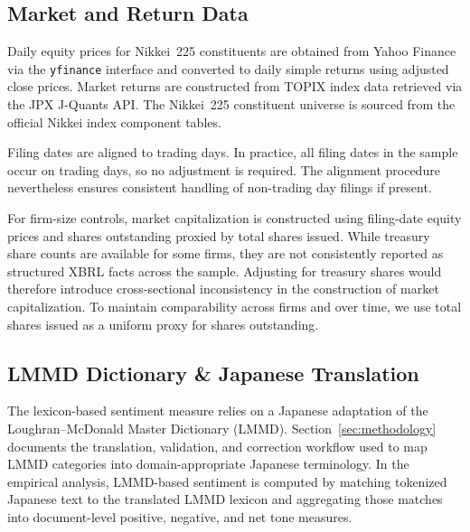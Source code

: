 \subsection{Market and Return Data}
Daily equity prices for Nikkei~225 constituents are obtained from Yahoo Finance via the
\texttt{yfinance} interface and converted to daily simple returns using adjusted close prices.
Market returns are constructed from TOPIX index data retrieved via the JPX J-Quants API.
The Nikkei~225 constituent universe is sourced from the official Nikkei index component tables.

Filing dates are aligned to trading days. In practice, all filing dates in the sample occur on trading days, so no adjustment is required. The alignment procedure nevertheless ensures consistent handling of non-trading day filings if present.

For firm-size controls, market capitalization is constructed using filing-date equity prices and shares outstanding proxied by total shares issued. While treasury share counts are available for some firms, they are not consistently reported as structured XBRL facts across the sample. Adjusting for treasury shares would therefore introduce cross-sectional inconsistency in the construction of market capitalization. To maintain comparability across firms and over time, we use total shares issued as a uniform proxy for shares outstanding.

\subsection{LMMD Dictionary \& Japanese Translation}
The lexicon-based sentiment measure relies on a Japanese adaptation of the Loughran--McDonald Master Dictionary (LMMD). Section~\ref{sec:methodology} documents the translation, validation, and correction workflow used to map LMMD categories into domain-appropriate Japanese terminology. In the empirical analysis, LMMD-based sentiment is computed by matching tokenized Japanese text to the translated LMMD lexicon and aggregating those matches into document-level positive, negative, and net tone measures.

